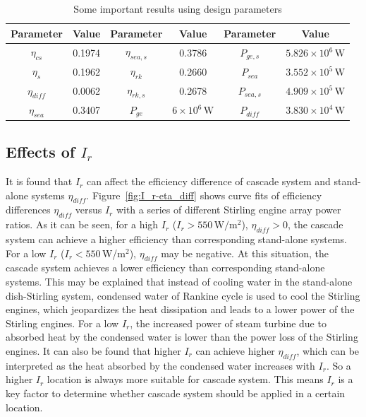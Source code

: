 \begin{table}[htbp]
	\caption{Some important results using design parameters}
	\begin{center}
	\begin{tabular}{cccccc}
		\toprule
		Parameter		&	Value	&	Parameter		&	Value	&	Parameter		&	Value\\
		\midrule
		$\eta_{cs}$		&	0.1974	&	$\eta_{sea,s}$	&	0.3786	&	$P_{ge,s}$	&	$5.826\times10^6\,\mathrm{W}$\\
		$\eta_{s}$	&	0.1962	&	$\eta_{rk}$	&	0.2660	&	$P_{sea}$		&	$3.552\times10^5\,\mathrm{W}$\\
		$\eta_{diff}$		&	0.0062	&	$\eta_{rk,s}$	&	0.2678	&	$P_{sea,s}$	&	$4.909\times10^5\,\mathrm{W}$\\
		$\eta_{sea}$	&	0.3407	&	$P_{ge}$		&	$6\times10^6\,\mathrm{W}$	&	$P_{diff}$		&	$3.830\times10^4\,\mathrm{W}$\\
		\bottomrule
	\end{tabular}
	\end{center}
	\label{tab:importantResults}
\end{table}

\subsection{Effects of $I_{r}$}
\label{sec:I_r}

It is found that $I_r$ can affect the efficiency difference of cascade system and stand-alone systems $\eta_{diff}$. Figure~\ref{fig:I_r-eta_diff} shows curve fits of efficiency differences $\eta_{diff}$ versus $I_r$ with a series of different Stirling engine array power ratios. As it can be seen, for a high $I_r$ ($I_r > 550\,\mathrm{W/m^2}$), $\eta_{diff}>0$, the cascade system can achieve a higher efficiency than corresponding stand-alone systems. For a low $I_r$ ($I_r < 550\,$W/m$^2$), $\eta_{diff}$ may be negative. At this situation, the cascade system achieves a lower efficiency than corresponding stand-alone systems. This may be explained that instead of cooling water in the stand-alone dish-Stirling system, condensed water of Rankine cycle is used to cool the Stirling engines, which jeopardizes the heat dissipation and leads to a lower power of the Stirling engines. For a low $I_r$, the increased power of steam turbine due to absorbed heat by the condensed water is lower than the power loss of the Stirling engines. It can also be found that higher $I_r$ can achieve higher $\eta_{diff}$, which can be interpreted as the heat absorbed by the condensed water increases with $I_r$. So a higher $I_r$ location is always more suitable for cascade system. This means $I_r$ is a key factor to determine whether cascade system should be applied in a certain location.

